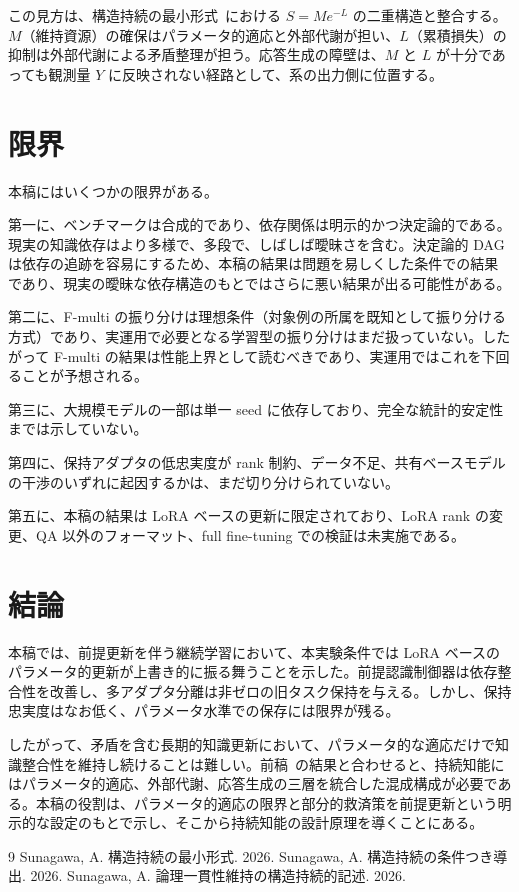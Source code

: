 \documentclass[12pt,a4paper]{article}
\begin{document}
この見方は、構造持続の最小形式~\cite{paper1}における $S = Me^{-L}$ の二重構造と整合する。$M$（維持資源）の確保はパラメータ的適応と外部代謝が担い、$L$（累積損失）の抑制は外部代謝による矛盾整理が担う。応答生成の障壁は、$M$ と $L$ が十分であっても観測量 $Y$ に反映されない経路として、系の出力側に位置する。

\section{限界}

本稿にはいくつかの限界がある。

第一に、ベンチマークは合成的であり、依存関係は明示的かつ決定論的である。現実の知識依存はより多様で、多段で、しばしば曖昧さを含む。決定論的 DAG は依存の追跡を容易にするため、本稿の結果は問題を易しくした条件での結果であり、現実の曖昧な依存構造のもとではさらに悪い結果が出る可能性がある。

第二に、F-multi の振り分けは理想条件（対象例の所属を既知として振り分ける方式）であり、実運用で必要となる学習型の振り分けはまだ扱っていない。したがって F-multi の結果は性能上界として読むべきであり、実運用ではこれを下回ることが予想される。

第三に、大規模モデルの一部は単一 seed に依存しており、完全な統計的安定性までは示していない。

第四に、保持アダプタの低忠実度が rank 制約、データ不足、共有ベースモデルの干渉のいずれに起因するかは、まだ切り分けられていない。

第五に、本稿の結果は LoRA ベースの更新に限定されており、LoRA rank の変更、QA 以外のフォーマット、full fine-tuning での検証は未実施である。

\section{結論}

本稿では、前提更新を伴う継続学習において、本実験条件では LoRA ベースのパラメータ的更新が上書き的に振る舞うことを示した。前提認識制御器は依存整合性を改善し、多アダプタ分離は非ゼロの旧タスク保持を与える。しかし、保持忠実度はなお低く、パラメータ水準での保存には限界が残る。

したがって、矛盾を含む長期的知識更新において、パラメータ的な適応だけで知識整合性を維持し続けることは難しい。前稿~\cite{paper3}の結果と合わせると、持続知能にはパラメータ的適応、外部代謝、応答生成の三層を統合した混成構成が必要である。本稿の役割は、パラメータ的適応の限界と部分的救済策を前提更新という明示的な設定のもとで示し、そこから持続知能の設計原理を導くことにある。

\begin{thebibliography}{9}
 Sunagawa, A. 構造持続の最小形式. 2026.
 Sunagawa, A. 構造持続の条件つき導出. 2026.
 Sunagawa, A. 論理一貫性維持の構造持続的記述. 2026.
\end{thebibliography}
\end{document}
